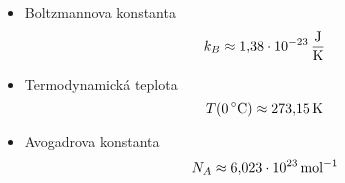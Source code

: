 \begin{itemize}
    \item Boltzmannova konstanta
        \begin{equation}
            k_{B}\approx1,\!38\cdot10^{-23}\,\mathrm{{\frac{J}{K}}}
        \end{equation}

    \item Termodynamická teplota
        \begin{equation}
            T(0\,\mathrm{{^{\circ}C}})\approx273,\!15\,\mathrm{{K}}
        \end{equation}

    \item Avogadrova konstanta
        \begin{equation}
            N_{A}\approx6,\!023\cdot10^{23}\,\mathrm{{mol^{-1}}}
        \end{equation}
\end{itemize}